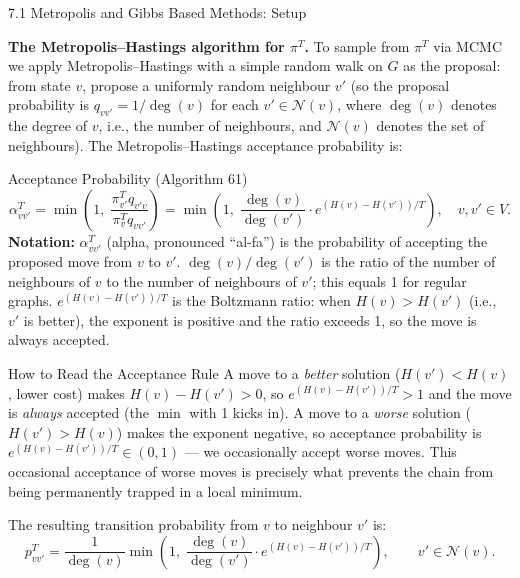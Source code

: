 \documentclass[aspectratio=169,10pt]{beamer}
\newcommand{\calN}{\mathcal{N}}
\begin{document}
\begin{frame}[allowframebreaks]{7.1 Metropolis and Gibbs Based Methods: Setup}
\framebreak

\textbf{The Metropolis--Hastings algorithm for $\pi^T$.}
To sample from $\pi^T$ via MCMC we apply Metropolis--Hastings with a simple
random walk on $G$ as the proposal: from state $v$, propose a uniformly
random neighbour $v'$ (so the proposal probability is
$q_{vv'} = 1/\deg(v)$ for each $v' \in \calN(v)$, where $\deg(v)$ denotes
the degree of $v$, i.e., the number of neighbours, and $\calN(v)$ denotes
the set of neighbours).  The Metropolis--Hastings acceptance probability is:

\begin{block}{Acceptance Probability (Algorithm 61)}
  \[
    \alpha^T_{vv'} = \min\!\left(1,\;
      \frac{\pi^T_{v'} q_{v'v}}{\pi^T_v q_{vv'}}
    \right)
    = \min\!\left(1,\;
      \frac{\deg(v)}{\deg(v')}\cdot
      e^{(H(v)-H(v'))/T}
    \right),
    \quad v,v' \in V.
  \]
  \textbf{Notation:} $\alpha^T_{vv'}$ (alpha, pronounced ``al-fa'') is the
  probability of accepting the proposed move from $v$ to $v'$.
  $\deg(v)/\deg(v')$ is the ratio of the number of neighbours of $v$ to the
  number of neighbours of $v'$; this equals 1 for regular graphs.
  $e^{(H(v)-H(v'))/T}$ is the Boltzmann ratio: when $H(v) > H(v')$ (i.e.,
  $v'$ is better), the exponent is positive and the ratio exceeds 1, so the
  move is always accepted.
\end{block}

\begin{alertblock}{How to Read the Acceptance Rule}
  A move to a \emph{better} solution ($H(v') < H(v)$, lower cost) makes
  $H(v) - H(v') > 0$, so $e^{(H(v)-H(v'))/T} > 1$ and the move is
  \emph{always} accepted (the $\min$ with 1 kicks in).  A move to a
  \emph{worse} solution ($H(v') > H(v)$) makes the exponent negative, so
  acceptance probability is $e^{(H(v)-H(v'))/T} \in (0,1)$ --- we
  occasionally accept worse moves.  This occasional acceptance of worse
  moves is precisely what prevents the chain from being permanently trapped
  in a local minimum.
\end{alertblock}

The resulting transition probability from $v$ to neighbour $v'$ is:
\[
  p^T_{vv'} = \frac{1}{\deg(v)}\min\!\left(1,\;
    \frac{\deg(v)}{\deg(v')}\cdot
    e^{(H(v)-H(v'))/T}
  \right), \qquad v' \in \calN(v).
\]


\end{frame}
\end{document}
